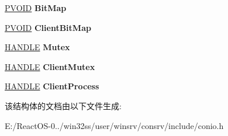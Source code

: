 \begin{DoxyCompactItemize}
\hyperlink{interfacevoid}{P\+V\+O\+ID} {\bfseries Bit\+Map}
\item 
\mbox{\label{struct___g_r_a_p_h_i_c_s___s_c_r_e_e_n___b_u_f_f_e_r_ad7296df8f843297807b06f54e967ff59}} 
\hyperlink{interfacevoid}{P\+V\+O\+ID} {\bfseries Client\+Bit\+Map}
\item 
\mbox{\label{struct___g_r_a_p_h_i_c_s___s_c_r_e_e_n___b_u_f_f_e_r_ac94f0a770bf1bed4a08d0b6a8b4a77ed}} 
\hyperlink{interfacevoid}{H\+A\+N\+D\+LE} {\bfseries Mutex}
\item 
\mbox{\label{struct___g_r_a_p_h_i_c_s___s_c_r_e_e_n___b_u_f_f_e_r_a5dbfe69f2c277dbacc3aab478a4cad9c}} 
\hyperlink{interfacevoid}{H\+A\+N\+D\+LE} {\bfseries Client\+Mutex}
\item 
\mbox{\label{struct___g_r_a_p_h_i_c_s___s_c_r_e_e_n___b_u_f_f_e_r_a8a112e879c8f88cde4adc8e8635851fe}} 
\hyperlink{interfacevoid}{H\+A\+N\+D\+LE} {\bfseries Client\+Process}
\end{DoxyCompactItemize}


该结构体的文档由以下文件生成\+:\begin{DoxyCompactItemize}
\item 
E\+:/\+React\+O\+S-\/0../win32ss/user/winsrv/consrv/include/conio.\+h\end{DoxyCompactItemize}

